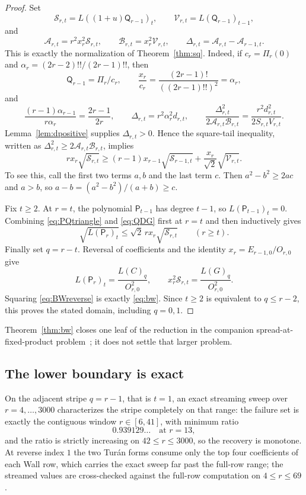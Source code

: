 \documentclass[11pt,a4paper]{article}
\theoremstyle{plain}
\theoremstyle{definition}
\theoremstyle{remark}
\begin{document}
\begin{proof}
Set
\[
 \mathcal S_{r,t}=L((1+u)\mathsf Q_{r-1})_t,\qquad
 \mathcal V_{r,t}=L(\mathsf Q_{r-1})_{t-1},
\]
and
\[
 \mathcal A_{r,t}=r^2x_r^2\mathcal S_{r,t},\qquad
 \mathcal B_{r,t}=x_r^2\mathcal V_{r,t},\qquad
 \Delta_{r,t}=\mathcal A_{r,t}-\mathcal A_{r-1,t}.
\]
This is exactly the normalization of Theorem~\ref{thm:sq}. Indeed, if
$c_r=\Pi_r(0)$ and $\alpha_r=(2r-2)!!/(2r-1)!!$, then
\[
 \mathsf Q_{r-1}=\Pi_r/c_r,
 \qquad \frac{x_r}{c_r}
   =\frac{(2r-1)!}{((2r-1)!!)^2}=\alpha_r,
\]
and
\[
 \frac{(r-1)\alpha_{r-1}}{r\alpha_r}=\frac{2r-1}{2r},
 \qquad
 \Delta_{r,t}=r^2\alpha_r^2d_{r,t},
 \qquad
 \frac{\Delta_{r,t}^2}{2\mathcal A_{r,t}\mathcal B_{r,t}}
   =\frac{r^2d_{r,t}^2}{2S_{r,t}V_{r,t}}.
\]
Lemma~\ref{lem:dpositive} supplies $\Delta_{r,t}>0$. Hence the square-tail
inequality, written as
$\Delta_{r,t}^2\ge2\mathcal A_{r,t}\mathcal B_{r,t}$, implies
\begin{equation}\label{eq:QDG}
 r x_r\sqrt{\mathcal S_{r,t}}
 \ge (r-1)x_{r-1}\sqrt{\mathcal S_{r-1,t}}
    +\frac{x_r}{\sqrt2}\sqrt{\mathcal V_{r,t}}.
\end{equation}
To see this, call the first two terms $a,b$ and the last term $c$.
Then $a^2-b^2\ge2ac$ and $a>b$, so
$a-b=(a^2-b^2)/(a+b)\ge c$.

Fix $t\ge2$. At $r=t$, the polynomial $\mathsf P_{t-1}$ has degree $t-1$, so
$L(\mathsf P_{t-1})_t=0$. Combining \eqref{eq:PQtriangle} and
\eqref{eq:QDG} first at
$r=t$ and then inductively gives
\begin{equation}\label{eq:BWreverse}
  \sqrt{L(\mathsf P_r)_t}\le\sqrt2\,r x_r\sqrt{\mathcal S_{r,t}}
  \qquad(r\ge t).
\end{equation}
Finally set $q=r-t$. Reversal of coefficients and the identity
$x_r=E_{r-1,0}/O_{r,0}$ give
\[
 L(\mathsf P_r)_t=\frac{L(C)_q}{O_{r,0}^2},\qquad
 x_r^2\mathcal S_{r,t}=\frac{L(G)_q}{O_{r,0}^2}.
\]
Squaring \eqref{eq:BWreverse} is exactly \eqref{eq:bw}. Since $t\ge2$ is
equivalent to $q\le r-2$, this proves the stated domain, including $q=0,1$.
\end{proof}

Theorem~\ref{thm:bw} closes one leaf of the reduction in the companion
spread-at-fixed-product problem~\cite{panel1}; it does not settle that larger
problem.

\subsection{The lower boundary is exact}

On the adjacent stripe $q=r-1$, that is $t=1$, an exact streaming sweep over
$r=4,\dots,3000$ characterizes the stripe completely on that range: the
failure set is exactly the contiguous window $r\in[6,41]$, with minimum
ratio
\[
  0.939129\ldots \quad\text{at } r=13,
\]
and the ratio is strictly increasing on $42\le r\le3000$, so the recovery is
monotone. At reverse index $1$ the two Tur\'an forms consume only the top
four coefficients of each Wall row, which carries the exact sweep far past
the full-row range; the streamed values are cross-checked against the
full-row computation on $4\le r\le69$.
\end{document}

